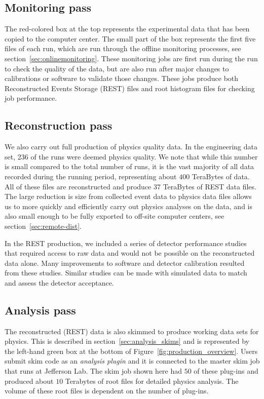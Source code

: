 \subsection{Monitoring pass \label{sec:recmonitoring}}

The red-colored box at the top
represents the experimental data that has been copied to the computer center. The small part of the box represents the first five files of each run, which are run through the offline monitoring processes, see section~\ref{sec:onlinemonitoring}. These monitoring jobs are first run during the run to check the quality of the data, but are also run after major changes to calibrations or software to validate those changes. These jobs produce both Reconstructed Events Storage (REST) files and root histogram files for checking job performance.

\subsection{Reconstruction pass \label{sec:recreconstruction}}

We also carry out full production of physics quality data. In the engineering data set, 236 of the
runs were deemed physics quality. We note that while this number is small compared to the total number of runs, it is the vast majority of all data recorded during the running period, 
representing about $400$ TeraBytes of data. All of these files are reconstructed and produce $37$ TeraBytes of REST data files. The large reduction is size from collected event data to physics data files allows us to  more quickly and efficiently carry out physics analyses on the data, and is also small enough to be fully exported to off-site computer centers, see section~\ref{sec:remote-dist}.

In the REST production, we included a series of detector performance studies that required access to raw data and would not be possible on the reconstructed data alone. Many improvements to software and detector calibration resulted from these studies. Similar studies can be made with simulated data to match and assess the detector acceptance.


\subsection{Analysis pass \label{sec:recanalysis}}

The reconstructed (REST) data is also skimmed to produce working data sets for physics. This is described in section~\ref{sec:analysis_skims} and is represented by the left-hand
green box at the bottom of Figure~\ref{fig:production_overview}. Users submit skim code as an \emph{analysis plugin} and it is connected to the master skim job that runs at Jefferson Lab. The skim job shown here had $50$ of these plug-ins and produced about $10$ Terabytes of root files for detailed physics analysis. The volume of these root files is dependent on the number of plug-ins.
